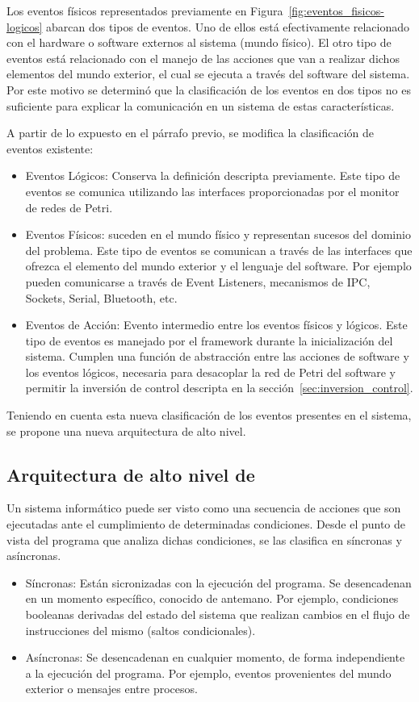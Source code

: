 Los eventos físicos representados previamente en
Figura~\ref{fig:eventos_fisicos-logicos} abarcan dos tipos de eventos. Uno de
ellos está efectivamente relacionado con el hardware o software externos al
sistema (mundo físico). El otro tipo de eventos está relacionado con el manejo
de las acciones que van a realizar dichos elementos del mundo exterior, el cual
se ejecuta a través del software del sistema.
Por este motivo se determinó que la clasificación de los
eventos en dos tipos no es suficiente para explicar la comunicación en un
sistema de estas características. 

A partir de lo expuesto en el párrafo previo, se modifica la clasificación
de eventos existente:

\begin{itemize}
    \item Eventos Lógicos: Conserva la definición descripta previamente. Este
    tipo de eventos se comunica utilizando las interfaces proporcionadas por el
    monitor de redes de Petri.
    \item Eventos Físicos: suceden en el mundo físico y representan sucesos del
    dominio del problema. Este tipo de eventos se comunican a través de las
    interfaces que ofrezca el elemento del mundo exterior y el lenguaje del
    software.
    Por ejemplo pueden comunicarse a través de Event Listeners, mecanismos
    de IPC, Sockets, Serial, Bluetooth, etc.
    \item Eventos de Acción: Evento intermedio
    entre los eventos físicos y lógicos. Este tipo de eventos es manejado
    por el framework durante la inicialización del sistema. Cumplen una función
    de abstracción entre las acciones de software y los eventos lógicos,
    necesaria para desacoplar la red de Petri del software y permitir la
    inversión de control descripta en la sección~\ref{sec:inversion_control}.
\end{itemize}

Teniendo en cuenta esta nueva clasificación de los eventos presentes en el
sistema, se propone una nueva arquitectura de alto nivel.

\subsection{Arquitectura de alto nivel de \nombreFramework}
\label{sec:arquitectura_alto_nivel}
Un sistema informático puede ser visto como una secuencia de acciones que son
ejecutadas ante el cumplimiento de determinadas condiciones. Desde el punto de
vista del programa que analiza dichas condiciones, se las clasifica
en síncronas y asíncronas.
  \begin{itemize}
	\item Síncronas: Están sicronizadas con la ejecución del programa. Se
	desencadenan en un momento específico, conocido de antemano.
	Por ejemplo, condiciones booleanas derivadas del estado del sistema que
	realizan cambios en el flujo de instrucciones del mismo (saltos
	condicionales).
	\item Asíncronas: Se desencadenan en cualquier momento, de forma independiente
	a la ejecución del programa. Por ejemplo, eventos provenientes del mundo
	exterior o mensajes entre procesos.
  \end{itemize}

